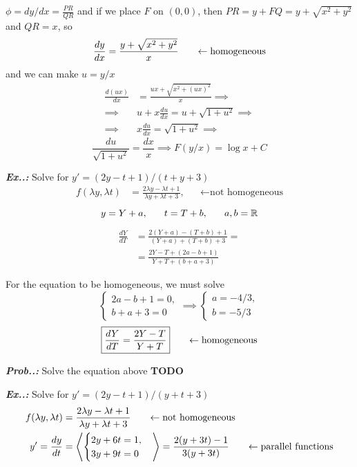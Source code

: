 \documentclass[a4paper]{article}
\begin{document}
$\phi=dy / dx=\frac{PR}{QR}$ and if we place $F$ on $(0,0)$, then $PR=y+FQ=y+\sqrt{ x^{2}+y^{2} }$ and $QR=x$, so
$$
\frac{dy}{dx}=\frac{y+\sqrt{ x^{2}+y^{2} }}{x}\hspace{4ex}\leftarrow\text{homogeneous}
$$
and we can make $u=y / x$
\begin{align}
\frac{d(ux)}{dx}&=\frac{ux+\sqrt{ x^{2}+(ux)^{2} }}{x}\implies \\
\implies&u+x \frac{du}{dx}=u+\sqrt{ 1+u^{2} }\implies \\
\implies&x \frac{du}{dx}=\sqrt{ 1+u^{2} } \implies
\end{align}
$$
\boxed{\frac{du}{\sqrt{ 1+u^{2} }}=\frac{dx}{x} \implies F(y / x)=\log x+C}
$$

\vspace{2ex}\textit{\textbf{Ex.\thesection.\theex:}} Solve for $y'=(2y-t+1) / (t+y+3)$
\begin{align}
f(\lambda y,\lambda t)&=\frac{2\lambda y-\lambda t+1}{\lambda y+\lambda t+3}, & &\leftarrow\text{not homogeneous}
\end{align}
$$
y=Y+a,\hspace{4ex}t=T+b,\hspace{4ex}a,b=\mathbb{R}
$$
\begin{align}
\frac{dY}{dT}&=\frac{2(Y+a)-(T+b)+1}{(Y+a)+(T+b)+3}= \\
&= \frac{2Y-T+(2a-b+1)}{Y+T+(b+a+3)}
\end{align}

For the equation to be homogeneous, we must solve
$$
\begin{cases}
2a-b+1=0, \\
b+a+3=0
\end{cases}\implies \begin{cases}
a=-4 / 3, \\
b=-5 / 3
\end{cases}
$$
$$
\boxed{\frac{dY}{dT}=\frac{2Y-T}{Y+T}}\hspace{4ex}\leftarrow\text{homogeneous}
$$

\vspace{2ex}\textit{\textbf{Prob.\thesection.\theex:}} Solve the equation above \textbf{TODO}

\vspace{2ex}\textit{\textbf{Ex.\thesection.\theex:}} Solve for $y'=(2y-t+1) / (y+t+3)$
\begin{align}
f(\lambda y,\lambda t)&=\frac{2\lambda y-\lambda t+1}{\lambda y+\lambda t+3}\hspace{4ex}\leftarrow\text{not homogeneous} \\
y'=\frac{dy}{dt}&=\left\langle\begin{cases}
2y+6t=1, \\
3y+9t=0
\end{cases}\right\rangle =\frac{2(y+3t)-1}{3(y+3t)} \hspace{4ex}\leftarrow\text{parallel functions}
\end{align}
\end{document}
